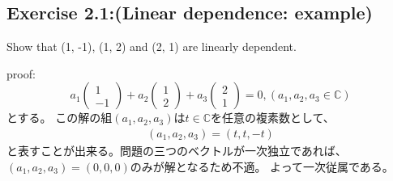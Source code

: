 \begin{flushleft}
\section{\Large Exercise 2.1:(Linear dependence: example) }
Show that (1, -1), (1, 2) and (2, 1) are linearly dependent.
\vspace{0.1in}

{\large proof:}
\begin{equation}
a_1\left(
	\begin{array}{c}
	1\\
	-1
	\end{array}
\right)
+ a_2\left(
	\begin{array}{c}
	1\\
	2
	\end{array}
\right)
+ a_3
\left(
	\begin{array}{c}
	2\\
	1
	\end{array}
\right)
= 0
, (a_1, a_2, a_3 \in \mathbb{C})
\end{equation}
とする。
\newline
この解の組$(a_1, a_2, a_3)$は$t\in \mathbb{C}$を任意の複素数として、
\begin{eqnarray}
(a_1, a_2, a_3) = (t, t, -t)
\end{eqnarray}
と表すことが出来る。問題の三つのベクトルが一次独立であれば、
$(a_1, a_2, a_3) = (0, 0, 0)$のみが解となるため不適。
よって一次従属である。
\end{flushleft}

